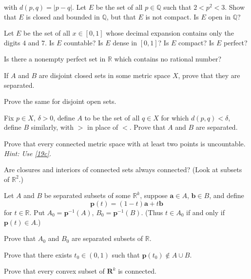 \begin{exercise}
  with \(d(p, q) = \lvert p - q\rvert\).
  Let \(E\) be the set of all \(p\in\mathbb{Q}\) such that \(2 < p^2 < 3\).
  Show that \(E\) is closed and bounded in \(\mathbb{Q}\), but that \(E\) is
  not compact.
  Is \(E\) open in \(\mathbb{Q}\)?
\item
  Let \(E\) be the set of all \(x\in[0, 1]\) whose decimal expansion contains
  only the digits \(4\) and \(7\).
  Is \(E\) countable?
  Is \(E\) dense in \([0, 1]\)?
  Is \(E\) compact?
  Is \(E\) perfect?
\item
  Is there a nonempty perfect set in \(\mathbb{R}\) which contains no rational
  number?
\item
  \begin{exercise}[label = (\alph*), ref = \arabic{exercisei} (\alph*)]
  \item
    If \(A\) and \(B\) are disjoint closed sets in some metric space \(X\),
    prove that they are separated.
  \item
    Prove the same for disjoint open sets.
  \item
    \label{19c}
    Fix \(p\in X\), \(\delta > 0\), define \(A\) to be the set of all
    \(q\in X\) for which \(d(p, q) < \delta\), define \(B\) similarly, with
    \(>\) in place of \(<\).
    Prove that \(A\) and \(B\) are separated.
  \item
    Prove that every connected metric space with at least two points is
    uncountable.
    \textit{Hint: Use \cref{19c}.}
  \end{exercise}
\item
  Are closures and interiors of connected sets always connected?
  (Look at subsets of \(\mathbb{R}^2\).)
\item
  Let \(A\) and \(B\) be separated subsets of some \(\mathbb{R}^k\), suppose
  \(\mathbold{a}\in A\), \(\mathbold{b}\in B\), and define
  \[
  \mathbold{p}(t) = (1 - t)\mathbold{a} + t\mathbold{b}
  \]
  for \(t\in\mathbb{R}\).
  Put \(A_0 = \mathbold{p}^{-1}(A)\), \(B_0 = \mathbold{p}^{-1}(B)\).
  (Thus \(t\in A_0\) if and only if \(\mathbold{p}(t)\in A\).)
  \begin{exercise}[label = (\alph*)]
  \item
    Prove that \(A_0\) and \(B_0\) are separated subsets of \(\mathbb{R}\).
  \item
    Prove that there exists \(t_0\in (0, 1)\) such that
    \(\mathbold{p}(t_0)\not\in A\cup B\).
  \item
    Prove that every convex subset of \(\mathbold{R}^k\) is connected.
  \end{exercise}

\end{exercise}
